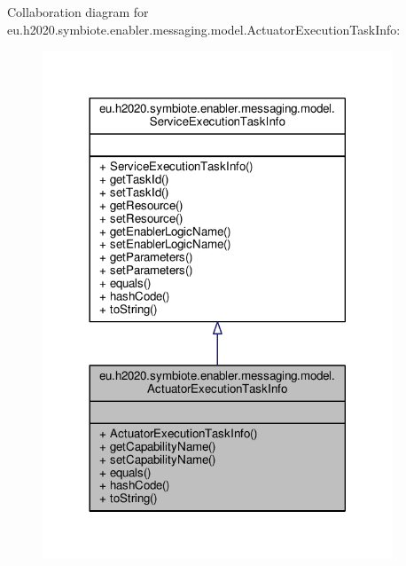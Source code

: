 Collaboration diagram for eu.\+h2020.\+symbiote.\+enabler.\+messaging.\+model.\+Actuator\+Execution\+Task\+Info\+:
\nopagebreak
\begin{figure}[H]
\begin{center}
\leavevmode
\includegraphics[width=296pt]{classeu_1_1h2020_1_1symbiote_1_1enabler_1_1messaging_1_1model_1_1ActuatorExecutionTaskInfo__coll__graph}
\end{center}
\end{figure}
